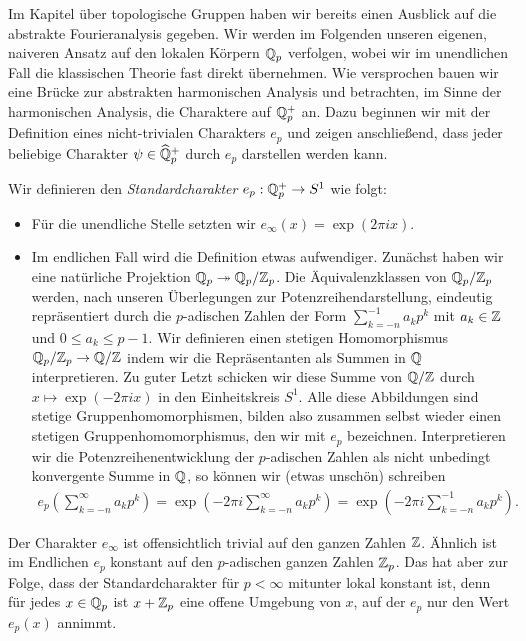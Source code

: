 		Im Kapitel über topologische Gruppen haben wir bereits einen Ausblick auf die abstrakte Fourieranalysis gegeben.
		Wir werden im Folgenden unseren eigenen, naiveren Ansatz auf den lokalen Körpern ${\mathbb{Q}_p}$ verfolgen, wobei wir im unendlichen Fall die klassischen Theorie fast direkt übernehmen.
		Wie versprochen bauen wir eine Brücke zur abstrakten harmonischen Analysis und betrachten, im Sinne der harmonischen Analysis, die Charaktere auf $\mathbb{Q}_p^+$ an.
		Dazu beginnen wir mit der Definition eines nicht-trivialen Charakters $e_p$ und zeigen anschließend, dass jeder beliebige Charakter $\psi \in \widehat{\mathbb{Q}}_p^+$ durch $e_p$ darstellen werden kann.
		\begin{defi}
			Wir definieren den \emph{Standardcharakter} $e_p:\mathbb{Q}_p^+ \to S^1$ wie folgt:
			\begin{itemize}%
				\item Für die unendliche Stelle setzten wir $e_\infty(x) = \exp(2\pi i x)$.
				\item Im endlichen Fall wird die Definition etwas aufwendiger. Zunächst haben wir eine natürliche Projektion ${\mathbb{Q}_p} \twoheadrightarrow {\mathbb{Q}_p}/{\mathbb{Z}_p}$.
				Die Äquivalenzklassen von ${\mathbb{Q}_p}/{\mathbb{Z}_p}$ werden, nach unseren Überlegungen zur Potenzreihendarstellung, eindeutig repräsentiert durch die $p$-adischen Zahlen der Form $\sum_{k=-n}^{-1} a_kp^k$ mit $a_k \in \mathbb{Z}$ und $0\leq a_k\leq p-1$.
				Wir definieren einen stetigen Homomorphismus ${\mathbb{Q}_p}/{\mathbb{Z}_p} \to \mathbb{Q}/\mathbb{Z}$ indem wir die Repräsentanten als Summen in $\mathbb{Q}$ interpretieren. 
				Zu guter Letzt schicken wir diese Summe von $\mathbb{Q}/\mathbb{Z}$ durch $x \mapsto \exp(-2\pi i x)$ in den Einheitskreis $S^1$. 
				Alle diese Abbildungen sind stetige Gruppenhomomorphismen, bilden also zusammen selbst wieder einen stetigen Gruppenhomomorphismus, den wir mit $e_p$ bezeichnen.
				Interpretieren wir die Potenzreihenentwicklung der $p$-adischen Zahlen als nicht unbedingt konvergente Summe in $\mathbb{Q}$, so können wir (etwas unschön) schreiben
				\begin{align*}
					e_p\left(\sum_{k=-n}^{\infty} a_kp^k\right) = \exp\left(-2\pi i \sum_{k=-n}^{\infty} a_kp^k\right) = \exp\left(-2\pi i \sum_{k=-n}^{-1} a_kp^k\right).
				\end{align*}
			\end{itemize}
		\end{defi}
		Der Charakter $e_\infty$ ist offensichtlich trivial auf den ganzen Zahlen $\mathbb{Z}$.
		Ähnlich ist im Endlichen $e_p$ konstant auf den $p$-adischen ganzen Zahlen ${\mathbb{Z}_p}$.
		Das hat aber zur Folge, dass der Standardcharakter für $p<\infty$ mitunter lokal konstant ist, denn für jedes $x \in {\mathbb{Q}_p}$ ist $x+{\mathbb{Z}_p}$ eine offene Umgebung von $x$, auf der $e_p$ nur den Wert $e_p(x)$ annimmt.
		

